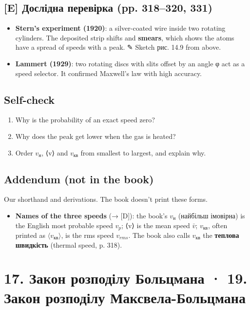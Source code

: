 \documentclass[11pt,a4paper,oneside]{book}
\newcommand{\pen}{{\sffamily\color{accent}✎}}
\begin{document}
\section*{[E] Дослідна перевірка (pp. 318–320, 331)}
\begin{itemize}
\item \textbf{Stern's experiment (1920)}: a silver-coated wire inside two rotating cylinders. The deposited strip shifts and \textbf{smears}, which shows the atoms have a spread of speeds with a peak. \pen{} Sketch рис. 14.9 from above.
\item \textbf{Lammert (1929)}: two rotating discs with slits offset by an angle φ act as a speed selector. It confirmed Maxwell's law with high accuracy.
\end{itemize}

\section*{Self-check}
\begin{enumerate}
\item Why is the probability of an exact speed zero?
\item Why does the peak get lower when the gas is heated?
\item Order $v_{\text{н}}$, ⟨v⟩ and $v_{\text{кв}}$ from smallest to largest, and explain why.
\end{enumerate}

\section*{Addendum (not in the book)}
Our shorthand and derivations. The book doesn't print these forms.
\begin{itemize}
\item \textbf{Names of the three speeds} (→ [D]): the book's $v_\text{н}$ (найбільш імовірна) is the English most probable speed $v_p$; ⟨v⟩ is the mean speed $\bar v$; $v_{\text{кв}}$, often printed as $\langle v_{\text{кв}}\rangle$, is the rms speed $v_{rms}$. The book also calls $v_{\text{кв}}$ the \textbf{теплова швидкість} (thermal speed, p. 318).
\end{itemize}

\chapter*{17. Закон розподілу Больцмана · 19. Закон розподілу Максвела-Больцмана}
\end{document}
